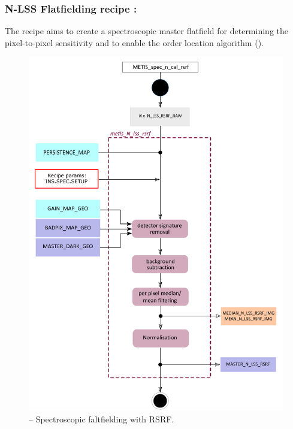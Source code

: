 \subsubsection{N-LSS Flatfielding recipe :}\label{rec:lssnrsrf}
The recipe  aims to create a spectroscopic master flatfield for determining the pixel-to-pixel sensitivity and to enable the order location algorithm ().
\begin{figure}[ht]
  \centering
  \includegraphics[width=0.5\textheight]{figures/metis_n_lss_rsrf_v0.74.pdf}
  \caption[Recipe: ]{ --
    Spectroscopic faltfielding with \ac{RSRF}.}
  \label{Fig:rec_n_lss_rsrf}
\end{figure}

